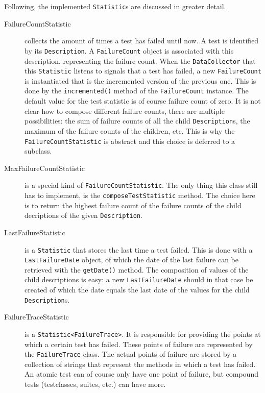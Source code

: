 \documentclass[i2]{oss}
\newcommand{\class}[1]{\texttt{#1}}
\newcommand{\method}[1]{\texttt{#1}}
\begin{document}
Following, the implemented \class{Statistic}s are discussed in greater detail.
\begin{description}

\item [FailureCountStatistic] collects the amount of times a test 
has failed until now.
A test is identified by its \class{Description}.
A \class{FailureCount} object is associated with this description,
representing the failure count.
When the \class{DataCollector} that this \class{Statistic} listens to
signals that a test has failed, a new \class{FailureCount} is instantiated that is the incremented version of the previous one. This is done by the \method{incremented()} method of the \class{FailureCount} instance. The default value for the test statistic is of course failure count of zero. It is not clear how to compose different failure counts, there are multiple possibilities: the sum of failure counts of all the child \class{Description}s, the maximum of the failure counts of the children, etc. This is why the \class{FailureCountStatistic} is abstract and this choice is deferred to a subclass.

\item [MaxFailureCountStatistic] is a special kind of 
\class{FailureCountStatistic}. The only thing this class still has to implement, is the \method{composeTestStatistic} method. The choice here is to return the highest failure count of the failure counts of the child decriptions of the given \class{Description}.

\item [LastFailureStatistic] is a \class{Statistic} that stores the last time a test failed. This is done with a \class{LastFailureDate} object, of which the date of the last failure can be retrieved with the \method{getDate()} method. The composition of values of the child descriptions is easy: a new \class{LastFailureDate} should in that case be created of which the date equals the last date of the values for the child \class{Description}s.

\item [FailureTraceStatistic] is a \class{Statistic<FailureTrace>}. It is responsible for providing the points at which a certain test has failed. These points of failure are represented by the \class{FailureTrace} class. The actual points of failure are stored by a collection of strings that represent the methods in which a test has failed. An atomic test can of course only have one point of failure, but compound tests (testclasses, suites, etc.) can have more.


\end{description}
\end{document}
